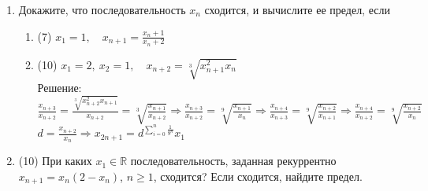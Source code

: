 \documentclass[a4paper]{article}
\begin{document}
\begin{enumerate}
    \item Докажите, что последовательность $x_n$ сходится, и вычислите ее предел, если
    \begin{enumerate}
        \item (7) $x_1=1,\quad x_{n+1}=\frac{x_n + 1}{x_n + 2}$
        \item (10) $x_1 = 2,\ x_2 = 1,\quad x_{n+2} = \sqrt[3]{x_{n+1}^2x_n}$\\
        Решение:\\
        $\frac{x_{n+3}}{x_{n+2}}=\frac{\sqrt[3]{x_{n+2}^2x_{n+1}}}{x_{n+2}}=\sqrt[3]{\frac{x_{n+1}}{x_{n+2}}} \Rightarrow \frac{x_{n+3}}{x_{n+2}} = \sqrt[9]{\frac{x_{n+1}}{x_n}} \Rightarrow \frac{x_{n+4}}{x_{n+3}} = \sqrt[9]{\frac{x_{n+2}}{x_{n+1}}} \Rightarrow \frac{x_{n+4}}{x_{n+2}} = \sqrt[9]{\frac{x_{n+2}}{x_{n}}}$\\
        $d = \frac{x_{n+2}}{x_{n}} \Rightarrow x_{2n+1} = d^{\sum_{i=0}^n\frac{1}{9^n}}x_1$
    \end{enumerate}
    
    \item (10) При каких $x_1\in\mathbb{R}$ последовательность, заданная рекуррентно $x_{n+1}=x_n(2-x_n)$, $n\geqslant1$, сходится? Если сходится, найдите предел.
\end{enumerate}
\end{document}
